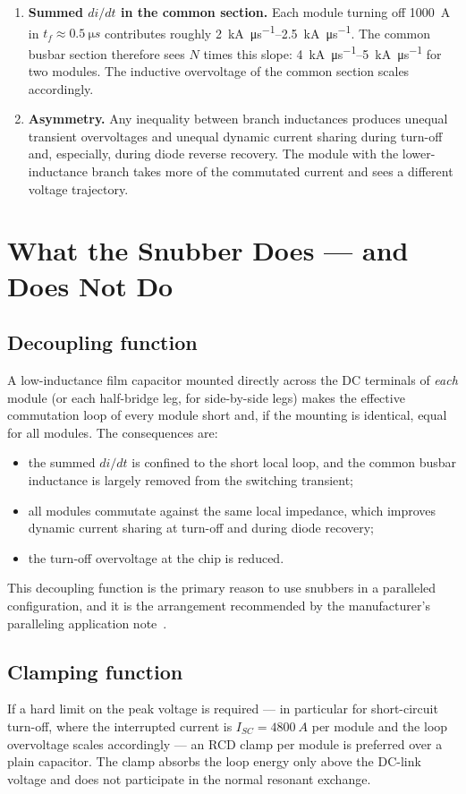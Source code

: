 \documentclass[11pt,a4paper]{article}
\begin{document}
\begin{enumerate}
\item \textbf{Summed $di/dt$ in the common section.} Each module turning off
\SI{1000}{A} in $t_f \approx \SI{0.5}{\micro s}$ contributes roughly
\SIrange{2}{2.5}{kA\per\micro s}. The common busbar section therefore sees
$N$ times this slope: \SIrange{4}{5}{kA\per\micro s} for two modules. The inductive
overvoltage of the common section scales accordingly.
\item \textbf{Asymmetry.} Any inequality between branch inductances produces unequal
transient overvoltages and unequal dynamic current sharing during turn-off and,
especially, during diode reverse recovery. The module with the lower-inductance branch
takes more of the commutated current and sees a different voltage trajectory.
\end{enumerate}

\section{What the Snubber Does --- and Does Not Do}
\subsection{Decoupling function}
A low-inductance film capacitor mounted directly across the DC terminals of
\emph{each} module (or each half-bridge leg, for side-by-side legs) makes the
effective commutation loop of every module short and, if the mounting is identical,
equal for all modules. The consequences are:
\begin{itemize}
\item the summed $di/dt$ is confined to the short local loop, and the common busbar
inductance is largely removed from the switching transient;
\item all modules commutate against the same local impedance, which improves dynamic
current sharing at turn-off and during diode recovery;
\item the turn-off overvoltage at the chip is reduced.
\end{itemize}
This decoupling function is the primary reason to use snubbers in a paralleled
configuration, and it is the arrangement recommended by the manufacturer's paralleling
application note~\cite{an2098}.

\subsection{Clamping function}
If a hard limit on the peak voltage is required --- in particular for short-circuit
turn-off, where the interrupted current is $I_{SC} = \SI{4800}{A}$ per module and the
loop overvoltage scales accordingly --- an RCD clamp per module is preferred over a
plain capacitor. The clamp absorbs the loop energy only above the DC-link voltage and
does not participate in the normal resonant exchange.
\end{document}
